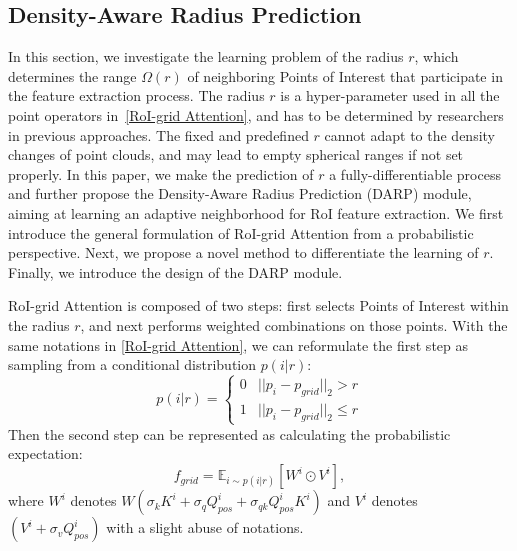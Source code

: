 \documentclass[10pt,twocolumn,letterpaper]{article}
\begin{document}
\subsection{Density-Aware Radius Prediction} \label{Density-Aware Radius Prediction}
In this section, we investigate the learning problem of the radius $r$, which determines the range $\Omega(r)$  of neighboring Points of Interest that participate in the feature extraction process. The radius $r$ is a hyper-parameter used in all the point operators in~\ref{RoI-grid Attention}, and has to be determined by researchers in previous approaches. The fixed and predefined $r$ cannot adapt to the density changes of point clouds, and may lead to empty spherical ranges if not set properly. In this paper, we make the prediction of $r$ a fully-differentiable process and further propose the Density-Aware Radius Prediction (DARP) module, aiming at learning an adaptive neighborhood for RoI feature extraction. We first introduce the general formulation of RoI-grid Attention from a probabilistic perspective. Next, we propose a novel method to differentiate the learning of $r$. Finally, we introduce the design of the DARP module.

RoI-grid Attention is composed of two steps: first selects Points of Interest within the radius $r$, and next performs weighted combinations on those points. With the same notations in \ref{RoI-grid Attention}, we can reformulate the first step as sampling from a conditional distribution $p(i|r)$:
\begin{equation} \label{3.2.1}
    p(i|r) = 
    \begin{cases}
    0 & ||p_{i} - p_{grid}||_{2} > r\\
    1 & ||p_{i} - p_{grid}||_{2} \leq r
    \end{cases}
\end{equation}
Then the second step can be represented as calculating the probabilistic expectation:
\begin{equation} \label{3.2.2}
    f_{grid} = \mathbb{E}_{i \sim p(i|r)}[W^{i} \odot V^{i}],
\end{equation}
where $W^{i}$ denotes $W(\sigma_{k} K^{i} + \sigma_{q} Q^{i}_{pos} + \sigma_{qk} Q^{i}_{pos}K^{i})$ and $V^{i}$ denotes $(V^{i} + \sigma_{v} Q^{i}_{pos})$ with a slight abuse of notations. 
\end{document}
